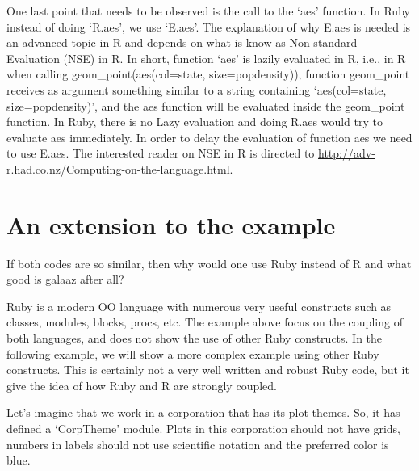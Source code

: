 \documentclass[]{article}
\begin{document}
One last point that needs to be observed is the call to the `aes'
function. In Ruby instead of doing `R.aes', we use `E.aes'. The
explanation of why E.aes is needed is an advanced topic in R and depends
on what is know as Non-standard Evaluation (NSE) in R. In short,
function `aes' is lazily evaluated in R, i.e., in R when calling
geom\_point(aes(col=state, size=popdensity)), function geom\_point
receives as argument something similar to a string containing
`aes(col=state, size=popdensity)', and the aes function will be
evaluated inside the geom\_point function. In Ruby, there is no Lazy
evaluation and doing R.aes would try to evaluate aes immediately. In
order to delay the evaluation of function aes we need to use E.aes. The
interested reader on NSE in R is directed to
\url{http://adv-r.had.co.nz/Computing-on-the-language.html}.

\section{An extension to the example}\label{an-extension-to-the-example}

If both codes are so similar, then why would one use Ruby instead of R
and what good is galaaz after all?

Ruby is a modern OO language with numerous very useful constructs such
as classes, modules, blocks, procs, etc. The example above focus on the
coupling of both languages, and does not show the use of other Ruby
constructs. In the following example, we will show a more complex
example using other Ruby constructs. This is certainly not a very well
written and robust Ruby code, but it give the idea of how Ruby and R are
strongly coupled.

Let's imagine that we work in a corporation that has its plot themes.
So, it has defined a `CorpTheme' module. Plots in this corporation
should not have grids, numbers in labels should not use scientific
notation and the preferred color is blue.
\end{document}

